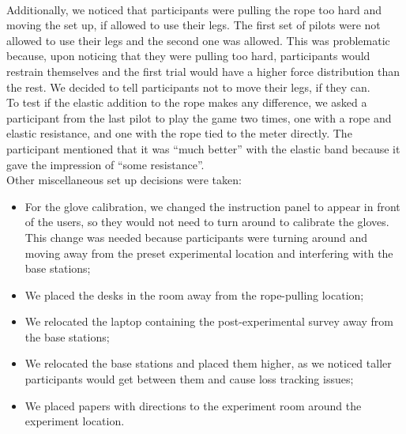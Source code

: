 \\
Additionally, we noticed that participants were pulling the rope too hard and moving the set up, if allowed to use their legs. The first set of pilots were not allowed to use their legs and the second one was allowed. This was problematic because, upon noticing that they were pulling too hard, participants would restrain themselves and the first trial would have a higher force distribution than the rest. We decided to tell participants not to move their legs, if they can. 
\\
To test if the elastic addition to the rope makes any difference, we asked a participant from the last pilot to play the game two times, one with a rope and elastic resistance, and one with the rope tied to the meter directly. The participant mentioned that it was ``much better'' with the elastic band because it gave the impression of ``some resistance''.
\\
Other miscellaneous set up decisions were taken:
\begin{itemize}
\itemsep0em 
    \item For the glove calibration, we changed the instruction panel to appear in front of the users, so they would not need to turn around to calibrate the gloves. This change was needed because participants were turning around and moving away from the preset experimental location and interfering with the base stations;
    \item We placed the desks in the room away from the rope-pulling location;
    \item We relocated the laptop containing the post-experimental survey away from the base stations;
    \item We relocated the base stations and placed them higher, as we noticed taller participants would get between them and cause loss tracking issues;
    \item We placed papers with directions to the experiment room around the experiment location.
\end{itemize}

